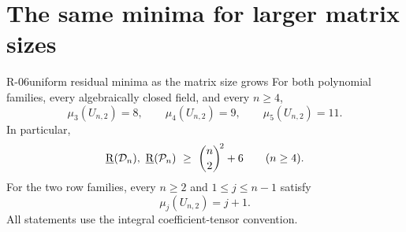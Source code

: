 \section{The same minima for larger matrix sizes}

\begin{finding}{R-06}{uniform residual minima as the matrix size grows}
For both polynomial families, every algebraically closed field,
and every $n\geq4$,
\[
 \mu_3(U_{n,2})=8,\qquad
 \mu_4(U_{n,2})=9,\qquad
 \mu_5(U_{n,2})=11.
\]
In particular,
\[
 \underline{\mathrm R}(\mathcal D_n),\ \underline{\mathrm R}(\mathcal P_n)
 \ \geq\ \binom n2^{\!2}+6\qquad(n\geq4).
\]
For the two row families, every $n\geq2$ and
$1\leq j\leq n-1$ satisfy
\[
 \mu_j(U_{n,2})=j+1.
\]
All statements use the integral coefficient-tensor convention.
\end{finding}
